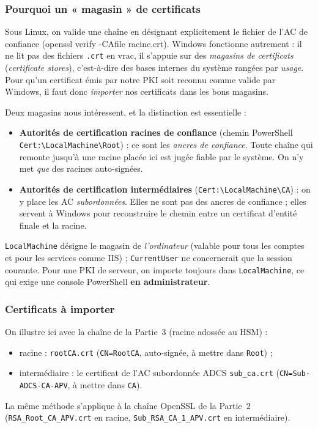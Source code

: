 \documentclass[11pt,a4paper]{article}
\newcommand{\tri}{\texttt{APV}}
\newcommand{\fichier}[1]{\texttt{#1}}
\newcommand{\cmdinline}[1]{\colorbox{outbg}{\ttfamily\small #1}}
\begin{document}
\subsubsection{Pourquoi un « magasin » de certificats}
Sous Linux, on valide une chaîne en désignant explicitement le fichier de l'AC de
confiance (\cmdinline{openssl verify -CAfile racine.crt}). Windows fonctionne autrement :
il ne lit pas des fichiers \fichier{.crt} en vrac, il s'appuie sur des \emph{magasins de
certificats} (\emph{certificate stores}), c'est-à-dire des bases internes du système
rangées par \emph{usage}. Pour qu'un certificat émis par notre PKI soit reconnu comme
valide par Windows, il faut donc \emph{importer} nos certificats dans les bons magasins.

Deux magasins nous intéressent, et la distinction est essentielle :
\begin{itemize}[leftmargin=1.4em]
  \item \textbf{Autorités de certification racines de confiance}
  (chemin PowerShell \texttt{Cert:\textbackslash LocalMachine\textbackslash Root}) : ce
  sont les \emph{ancres de confiance}. Toute chaîne qui remonte jusqu'à une racine placée
  ici est jugée fiable par le système. On n'y met \emph{que} des racines auto-signées.
  \item \textbf{Autorités de certification intermédiaires}
  (\texttt{Cert:\textbackslash LocalMachine\textbackslash CA}) : on y place les AC
  \emph{subordonnées}. Elles ne sont pas des ancres de confiance ; elles servent à
  Windows pour reconstruire le chemin entre un certificat d'entité finale et la racine.
\end{itemize}

\begin{notebox}
\texttt{LocalMachine} désigne le magasin de \emph{l'ordinateur} (valable pour tous les
comptes et pour les services comme IIS) ; \texttt{CurrentUser} ne concernerait que la
session courante. Pour une PKI de serveur, on importe toujours dans
\texttt{LocalMachine}, ce qui exige une console PowerShell \textbf{en administrateur}.
\end{notebox}

\subsubsection{Certificats à importer}
On illustre ici avec la chaîne de la Partie~3 (racine adossée au HSM) :
\begin{itemize}[leftmargin=1.4em]
  \item racine : \fichier{rootCA.crt} (\texttt{CN=RootCA}, auto-signée, à mettre dans
  \texttt{Root}) ;
  \item intermédiaire : le certificat de l'AC subordonnée ADCS \fichier{sub\_ca.crt}
  (\texttt{CN=Sub-ADCS-CA-APV}, à mettre dans \texttt{CA}).
\end{itemize}
La même méthode s'applique à la chaîne OpenSSL de la Partie~2
(\fichier{RSA\_Root\_CA\_\tri.crt} en racine, \fichier{Sub\_RSA\_CA\_1\_\tri.crt} en
intermédiaire).
\end{document}
